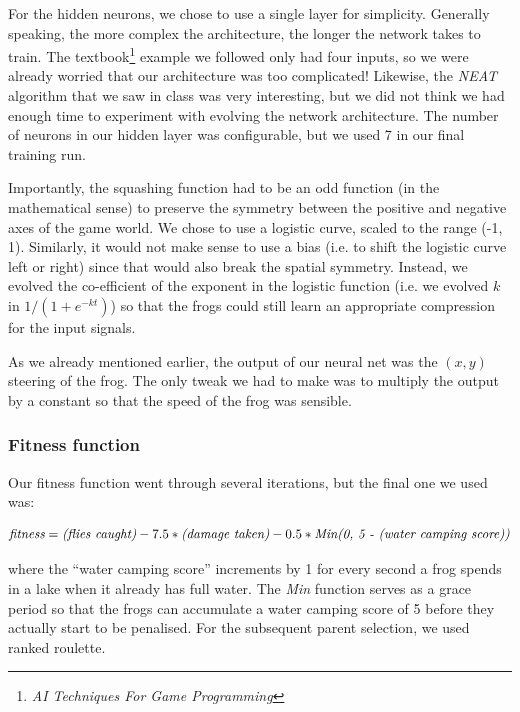For the hidden neurons, we chose to use a single layer for simplicity. Generally speaking, the more complex the architecture, the longer the network takes to train. The textbook\footnote{\textit{AI Techniques For Game Programming}} example we followed only had four inputs, so we were already worried that our architecture was too complicated! Likewise, the \textit{NEAT} algorithm that we saw in class was very interesting, but we did not think we had enough time to experiment with evolving the network architecture. The number of neurons in our hidden layer was configurable, but we used 7 in our final training run.

Importantly, the squashing function had to be an odd function (in the mathematical sense) to preserve the symmetry between the positive and negative axes of the game world. We chose to use a logistic curve, scaled to the range (-1, 1). Similarly, it would not make sense to use a bias (i.e. to shift the logistic curve left or right) since that would also break the spatial symmetry. Instead, we evolved the co-efficient of the exponent in the logistic function (i.e. we evolved $k$ in $1/(1 + e^{-kt})$) so that the frogs could still learn an appropriate compression for the input signals.

As we already mentioned earlier, the output of our neural net was the $(x, y)$ steering of the frog. The only tweak we had to make was to multiply the output by a constant so that the speed of the frog was sensible.

\subsubsection{Fitness function}

Our fitness function went through several iterations, but the final one we used was:

\begin{align}
\textit{\text{fitness}} = \textit{\text{(flies caught)}} - 7.5 * \textit{\text{(damage taken)}} - 0.5 * \textit{\text{Min}(0, }\textit{\text{5 - (water camping score)}}\textit{)}
\label{eqn:2}
\end{align}

where the ``water camping score'' increments by 1 for every second a frog spends in a lake when it already has full water. The \textit{Min} function serves as a grace period so that the frogs can accumulate a water camping score of 5 before they actually start to be penalised. For the subsequent parent selection, we used ranked roulette.

